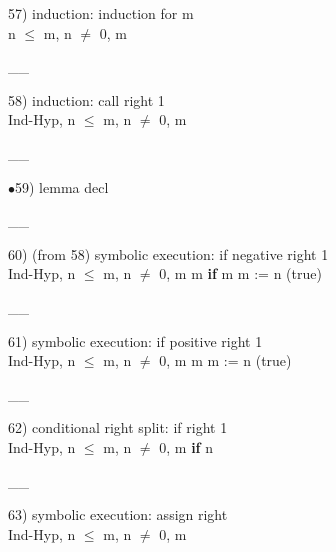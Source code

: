\documentclass[a4paper]{article}
\begin{document}
57) induction: induction  for m\\
n $\le$ m, n $\neq$ 0, m %

\vspace{-1.5ex}\_\hrulefill \_

58) induction: call right  1\\
Ind-Hyp, n $\le$ m, n $\neq$ 0, m %

\vspace{-1.5ex}\_\hrulefill \_

$\bullet$59) lemma decl \\
 \Fol 

\vspace{-1.5ex}\_\hrulefill \_

60)  (from 58) symbolic execution: if negative right  1\\
\tabf Ind-Hyp, n $\le$ m, n $\neq$ 0, m %
\Fol {} m %
 \tabf {} {\bf if} m %
 \tabf {} m := n\Dc
(true)

\vspace{-1.5ex}\_\hrulefill \_

61) symbolic execution: if positive right  1\\
\tabf Ind-Hyp, n $\le$ m, n $\neq$ 0, m %
\Fol {} m %
 \tabf {} m := n\Dc
(true)

\vspace{-1.5ex}\_\hrulefill \_

62) conditional right split: if right  1\\
\tabf Ind-Hyp, n $\le$ m, n $\neq$ 0, m %
\Fol \Do 
{\bf if} n %

\vspace{-1.5ex}\_\hrulefill \_

63) symbolic execution: assign right \\
Ind-Hyp, n $\le$ m, n $\neq$ 0, m %
\end{document}
